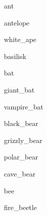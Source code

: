 \documentclass[letterpaper,serif]{module}
\begin{document}
\raggedbottom

\begin{newmonster}{ant}\end{newmonster}

\begin{newmonster}{antelope}\end{newmonster}

\begin{newmonster}{white_ape}\end{newmonster}

\begin{newmonster}{basilisk}\end{newmonster}


\begin{newmonster}{bat}\end{newmonster}

\begin{newmonster}{giant_bat}\end{newmonster}

\begin{newmonster}{vampire_bat}\end{newmonster}


\begin{newmonster}{black_bear}\end{newmonster}

\begin{newmonster}{grizzly_bear}\end{newmonster}

\begin{newmonster}{polar_bear}\end{newmonster}

\begin{newmonster}{cave_bear}\end{newmonster}

\begin{newmonster}{bee}\end{newmonster}


\begin{newmonster}{fire_beetle}\end{newmonster}
\end{document}

